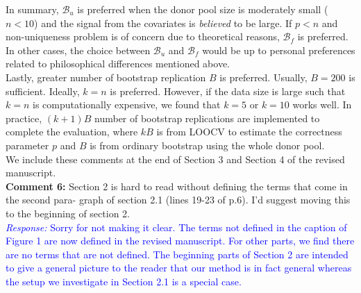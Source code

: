 \documentclass[12pt]{article}
\newcommand{\response}[1]{\noindent \textcolor{blue}{\emph{Response:} #1}}
\begin{document}
{In summary, $\mathcal{B}_u$ is preferred when  the donor pool size is moderately small ($n< 10$) and the signal from the covariates is \emph{believed} to be large. If $p < n$ and non-uniqueness problem is of concern due to theoretical reasons,  $\mathcal{B}_f$ is preferred. In other cases, the choice between  $\mathcal{B}_u$  and  $\mathcal{B}_f$ would be up to personal preferences related to philosophical differences mentioned above.  \\

Lastly,  greater number of bootstrap replication $B$ is preferred. Usually, $B = 200$ is sufficient. Ideally, $k=n$ is preferred. However, if the data size is large such that $k=n$ is computationally expensive, we found that $k = 5$ or $k = 10$ works well. In practice, $(k+1) B$ number of bootstrap replications are implemented to complete the evaluation, where $k B$ is from LOOCV to estimate the correctness parameter $p$ and $B$ is from ordinary bootstrap using the whole donor pool. \\

We include these comments at the end of Section 3 and Section 4 of the revised manuscript.} \\

{\bf Comment 6:} Section 2 is hard to read without defining the terms that come in the second para- graph of section 2.1 (lines 19-23 of p.6). I'd suggest moving this to the beginning of section 2. \\

\response{Sorry for not making it clear. The terms not defined in the caption of Figure 1 are now defined in the revised manuscript. For other parts, we find there are no terms that are not defined. The beginning parts of Section 2 are intended to give a general picture to the reader that our method is in fact general whereas the setup we investigate in Section 2.1 is a special case. }


\end{document}
